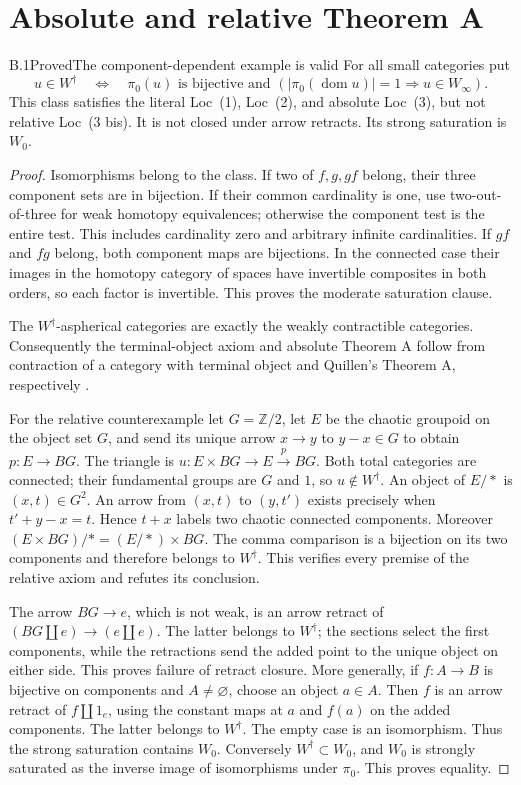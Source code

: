 \section{Absolute and relative Theorem A}

\begin{claim}{B.1}{Proved}{The component-dependent example is valid}
For all small categories put
\[
 u\in W^\dagger\quad\Longleftrightarrow\quad
 \pi _0(u)\text{ is bijective and }
 (|\pi _0(\operatorname{dom}u)|=1\Longrightarrow u\in W_\infty).
\]
This class satisfies the literal Loc~(1), Loc~(2), and absolute Loc~(3), but
not relative Loc~(3 bis). It is not closed under arrow retracts. Its strong
saturation is $W_0$.
\end{claim}
\begin{proof}
Isomorphisms belong to the class. If two of $f,g,gf$ belong, their three
component sets are in bijection. If their common cardinality is one, use
two-out-of-three for weak homotopy equivalences; otherwise the component
test is the entire test. This includes cardinality zero and arbitrary
infinite cardinalities. If $gf$ and $fg$ belong, both component maps are
bijections. In the connected case their images in the homotopy category
of spaces have invertible composites in both orders, so each factor is
invertible. This proves the moderate saturation clause.

The $W^\dagger$-aspherical categories are exactly the weakly contractible
categories. Consequently the terminal-object axiom and absolute Theorem A
follow from contraction of a category with terminal object and Quillen's
Theorem A, respectively \citep[\S1, Theorem A, p.~93]{RESQuillen1973}.

For the relative counterexample let $G=\mathbb Z/2$, let $E$ be the chaotic
groupoid on the object set $G$, and send its unique arrow $x\to y$ to
$y-x\in G$ to obtain $p:E\to BG$. The triangle is
$u:E\times BG\to E\xrightarrow p BG$. Both total categories are connected;
their fundamental groups are $G$ and $1$, so $u\notin W^\dagger$.
An object of $E/*$ is $(x,t)\in G^2$. An arrow from $(x,t)$ to $(y,t')$
exists precisely when $t'+y-x=t$. Hence $t+x$ labels two chaotic connected
components. Moreover $(E\times BG)/*=(E/*)\times BG$. The comma comparison
is a bijection on its two components and therefore belongs to
$W^\dagger$. This verifies every premise of the relative axiom and
refutes its conclusion.

The arrow $BG\to e$, which is not weak, is an arrow retract of
$(BG\amalg e)\to(e\amalg e)$. The latter belongs to $W^\dagger$; the
sections select the first components, while the retractions send the added
point to the unique object on either side. This proves failure of retract
closure. More generally, if $f:A\to B$ is bijective on components and
$A\ne\varnothing$, choose an object $a\in A$. Then $f$ is an arrow retract
of $f\amalg1_e$, using the constant maps at $a$ and $f(a)$ on the added
components. The latter belongs to $W^\dagger$. The empty case is an
isomorphism. Thus the strong saturation contains $W_0$. Conversely
$W^\dagger\subset W_0$, and $W_0$ is strongly saturated as the inverse
image of isomorphisms under $\pi _0$. This proves equality.
\end{proof}

